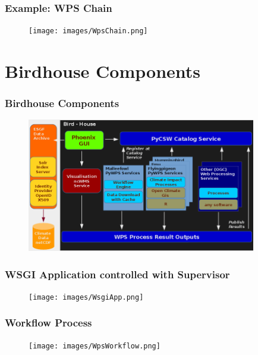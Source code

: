 \documentclass{beamer}
\begin{document}

  \begin{frame}[plain]
    \frametitle{Example: WPS Chain}
    \begin{figure}
      \texttt{[image: images/WpsChain.png]}
    \end{figure}
  \end{frame}


  \section{Birdhouse Components}


  \begin{frame}[plain]
    \frametitle{Birdhouse Components}
    \begin{figure}
      \begin{center}
        \includegraphics[width=10cm]{images/birdhouse.png}
      \end{center}
    \end{figure}
  \end{frame}


  \begin{frame}[plain]
    \frametitle{WSGI Application controlled with Supervisor}
    \begin{figure}
      \texttt{[image: images/WsgiApp.png]}
    \end{figure}
  \end{frame}


  \begin{frame}[plain]
    \frametitle{Workflow Process}
    \begin{figure}
      \texttt{[image: images/WpsWorkflow.png]}
    \end{figure}
  \end{frame}
\end{document}
